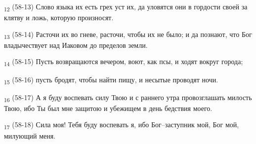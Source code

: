 \begin{tcolorbox}
\textsubscript{12} (58-13) Слово языка их есть грех уст их, да уловятся они в гордости своей за клятву и ложь, которую произносят.
\end{tcolorbox}
\begin{tcolorbox}
\textsubscript{13} (58-14) Расточи их во гневе, расточи, чтобы их не было; и да познают, что Бог владычествует над Иаковом до пределов земли.
\end{tcolorbox}
\begin{tcolorbox}
\textsubscript{14} (58-15) Пусть возвращаются вечером, воют, как псы, и ходят вокруг города;
\end{tcolorbox}
\begin{tcolorbox}
\textsubscript{15} (58-16) пусть бродят, чтобы найти пищу, и несытые проводят ночи.
\end{tcolorbox}
\begin{tcolorbox}
\textsubscript{16} (58-17) А я буду воспевать силу Твою и с раннего утра провозглашать милость Твою, ибо Ты был мне защитою и убежищем в день бедствия моего.
\end{tcolorbox}
\begin{tcolorbox}
\textsubscript{17} (58-18) Сила моя! Тебя буду воспевать я, ибо Бог--заступник мой, Бог мой, милующий меня.
\end{tcolorbox}
